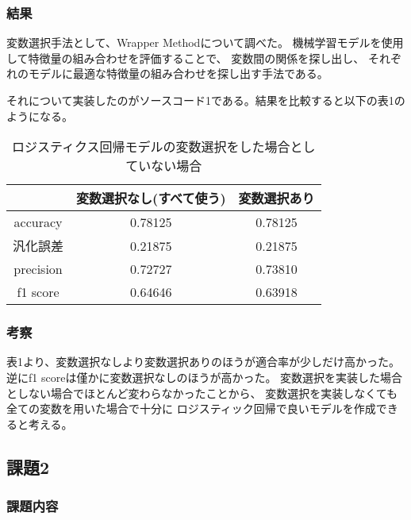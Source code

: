 \documentclass[12pt]{jarticle}
\begin{document}
\subsubsection*{結果}

変数選択手法として、Wrapper Methodについて調べた。
機械学習モデルを使用して特徴量の組み合わせを評価することで、
変数間の関係を探し出し、
それぞれのモデルに最適な特徴量の組み合わせを探し出す手法である。

それについて実装したのがソースコード1である。結果を比較すると以下の表1のようになる。

\begin{table}[htb]
    \caption{ロジスティクス回帰モデルの変数選択をした場合としていない場合}
    \begin{center}
        \begin{tabular}{|c||c|c|}
            \hline
                      & 変数選択なし(すべて使う) & 変数選択あり \\ \hline \hline
            accuracy  & 0.78125                  & 0.78125      \\ \hline
            汎化誤差  & 0.21875                  & 0.21875      \\ \hline
            precision & 0.72727                  & 0.73810      \\ \hline
            f1 score  & 0.64646                  & 0.63918      \\ \hline
        \end{tabular}
    \end{center}
\end{table}

\clearpage

\subsubsection*{考察}
表1より、変数選択なしより変数選択ありのほうが適合率が少しだけ高かった。
逆にf1 scoreは僅かに変数選択なしのほうが高かった。
変数選択を実装した場合としない場合でほとんど変わらなかったことから、
変数選択を実装しなくても全ての変数を用いた場合で十分に
ロジスティック回帰で良いモデルを作成できると考える。

\subsection{課題2}
\subsubsection*{課題内容}
\end{document}
